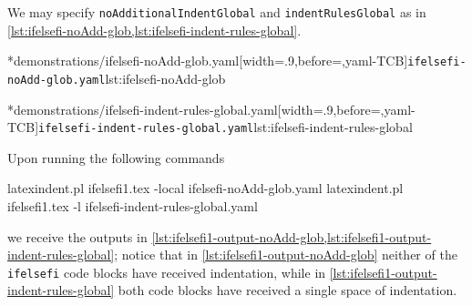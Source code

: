 	\begin{minipage}{.45\textwidth}
	\end{minipage}
	\hfill
	\begin{minipage}{.5\textwidth}
	\end{minipage}

	We may specify \texttt{noAdditionalIndentGlobal} and \texttt{indentRulesGlobal} as in \cref{lst:ifelsefi-noAdd-glob,lst:ifelsefi-indent-rules-global}.

	\begin{minipage}{.49\textwidth}
		\cmhlistingsfromfile[style=yaml-LST]*{demonstrations/ifelsefi-noAdd-glob.yaml}[width=.9\linewidth,before=\centering,yaml-TCB]{\texttt{ifelsefi-noAdd-glob.yaml}}{lst:ifelsefi-noAdd-glob}
	\end{minipage}
	\hfill
	\begin{minipage}{.49\textwidth}
		\cmhlistingsfromfile[style=yaml-LST]*{demonstrations/ifelsefi-indent-rules-global.yaml}[width=.9\linewidth,before=\centering,yaml-TCB]{\texttt{ifelsefi-indent-rules-global.yaml}}{lst:ifelsefi-indent-rules-global}
	\end{minipage}

	Upon running the following commands
	\begin{commandshell}
latexindent.pl ifelsefi1.tex -local ifelsefi-noAdd-glob.yaml  
latexindent.pl ifelsefi1.tex -l ifelsefi-indent-rules-global.yaml  
\end{commandshell}
	we receive the outputs in \cref{lst:ifelsefi1-output-noAdd-glob,lst:ifelsefi1-output-indent-rules-global}; notice that  in
	\cref{lst:ifelsefi1-output-noAdd-glob} neither of the \texttt{ifelsefi} code blocks have received indentation, while in
	\cref{lst:ifelsefi1-output-indent-rules-global} both code blocks have received a single space of indentation.

	\begin{minipage}{.45\textwidth}
	\end{minipage}
	\hfill
	\begin{minipage}{.45\textwidth}
	\end{minipage}
